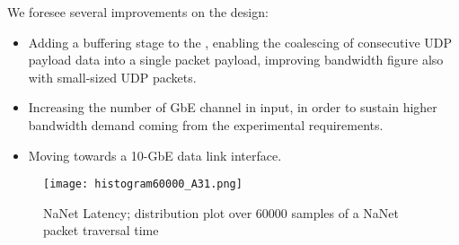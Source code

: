 We foresee several improvements on the  design:

\begin{itemize}
\item Adding a buffering stage to the , enabling the
  coalescing of consecutive UDP payload data into a single \apenetp
  packet payload, improving bandwidth figure also with small-sized UDP
  packets.
\item Increasing the number of GbE channel in input, in order to
  sustain higher bandwidth demand coming from the experimental
  requirements.
\item Moving towards a 10-GbE data link interface.
\end{itemize}
\begin{figure}[h!]
  \centering
  \texttt{[image: histogram60000\_A31.png]}
  \caption{NaNet Latency; distribution plot over 60000 samples of a 
  NaNet packet traversal time}
  \label{fig:nanetlat}
\end{figure} 
